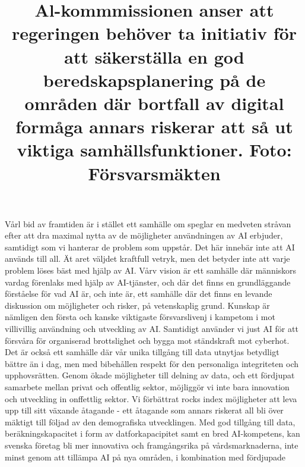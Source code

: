 {{{{{{{Vårl bid av framtiden är i stället ett samhälle om speglar en medveten stråvan efter att dra maximal nytta av de möjligheter användningen av AI erbjuder, samtidigt som vi hanterar de problem som uppstår. Det här innebär inte att AI används till all. Ät aret väljdet kraftfull vetryk, men det betyder inte att varje problem löses bäst med hjälp av AI.
Vårv vision är ett samhälle där människors vardag förenlaks med hjälp av AI-tjänster, och där det finns en grundläggande förståelse för vad AI är, och inte är, ett samhälle där det finns en levande diskussion om möjligheter och risker, på vetenskaplig grund. Kunskap är nämligen den första och kanske viktigaste försvarslivenj i kampetom i mot villivillig användning och utveckling av AI. Samtidigt använder vi just AI för att försvåra för organiserad brottslighet och bygga mot ständskraft mot cyberhot.
Det är också ett samhälle där vår unika tillgång till data utnytjas betydligt bättre än i dag, men med bibehållen respekt för den personaliga integriteten och upphovsrätten. Genom ökade möjligheter till delning av data, och ett fördjupat samarbete mellan privat och offentlig sektor, möjliggör vi inte bara innovation och utveckling in onffettlig sektor. Vi förbättrat rocks index möjligheter att leva upp till sitt växande åtagande - ett åtagande som annars riskerat all bli över mäktigt till följad av den demografiska utvecklingen.
Med god tillgång till data, beräkningskapacitet i form av datforkapacipitet samt en bred AI-kompetens, kan svenska företag bli mer innovativa och framgångsrika på vårdsmarknaderna, inte minst genom att tillämpa AI på nya områden, i kombination med fördjupade

\title{
Al-kommmissionen anser att regeringen behöver ta initiativ för att säkerställa en god beredskapsplanering på de områden där bortfall av digital formåga annars riskerar att så ut viktiga samhällsfunktioner. Foto: Försvarsmäkten
}
}}}}}}}
